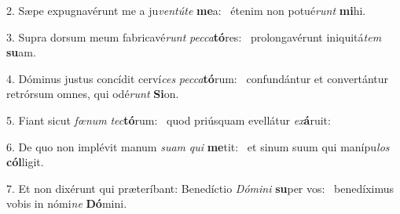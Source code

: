 2. Sæpe expugnavérunt me a ju\textit{ven}\textit{tú}\textit{te} \textbf{me}a: \ast\  étenim non potué\textit{runt} \textbf{mi}hi.\

3. Supra dorsum meum fabricavé\textit{runt} \textit{pec}\textit{ca}\textbf{tó}res: \ast\  prolongavérunt iniquitá\textit{tem} \textbf{su}am.\

4. Dóminus justus concídit cerví\textit{ces} \textit{pec}\textit{ca}\textbf{tó}rum: \ast\  confundántur et convertántur retrórsum omnes, qui odé\textit{runt} \textbf{Si}on.\

5. Fiant sicut \textit{fœ}\textit{num} \textit{tec}\textbf{tó}rum: \ast\  quod priúsquam evellátur \textit{ex}\textbf{á}ruit:\

6. De quo non implévit manum \textit{su}\textit{am} \textit{qui} \textbf{me}tit: \ast\  et sinum suum qui manípu\textit{los} \textbf{cól}ligit.\

7. Et non dixérunt qui præteríbant: Benedíctio \textit{Dó}\textit{mi}\textit{ni} \textbf{su}per vos: \ast\  benedíximus vobis in nómi\textit{ne} \textbf{Dó}mini.\

